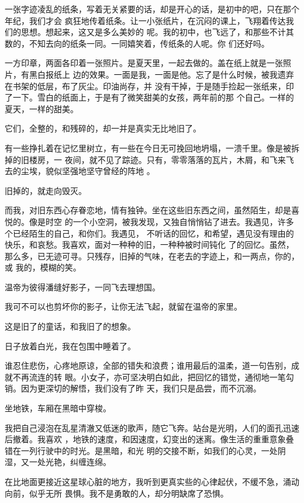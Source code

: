 \documentclass[12pt,a4paper]{article}
\begin{document}
		一张字迹凌乱的纸条，写着无关紧要的话，却是开心的话，是初中的吧，只在那个年纪，我们才会
	疯狂地传着纸条。让一小张纸片，在沉闷的课上，飞翔着传达我们的思想。想起来，这又是多么美妙的
	呢。我的初中，也飞远了，和那些不计其数的，不知去向的纸条一同。一同嬉笑着，传纸条的人呢。你
	们还好吗。

		一方印章，两面各印着一张照片。是夏天里，一起去做的。盖在纸上就是一张照片，有黑白报纸上
	边的效果。一面是我，一面是他。忘了是什么时候，被我遗弃在书架的低层，布了灰尘。印油尚存，并
	没有干掉，于是随手捡起一张纸来，印了一下。雪白的纸面上，于是有了微笑甜美的女孩，两年前的那
	个自己。一样的夏天，一样的甜美。

		它们，全整的，和残碎的，却一并是真实无比地旧了。

		有一些挣扎着在记忆里树立，有一些在今日无可挽回地坍塌，一溃千里。像是被拆掉的旧楼房，一
	夜间，就不见了踪迹。只有，零零落落的瓦片，木屑，和飞来飞去的尘埃，貌似坚强地坚守曾经的阵地
	。

		旧掉的，就走向毁灭。

		而我，对旧东西心存眷恋地，情有独钟。坐在这些旧东西之间，虽然陌生，却是喜悦的。像是时空
	的一个小空洞，被我发现，又独自悄悄钻了进去。我遇见，许多个已经陌生的自己，和你们。我遇见，
	不听话的回忆，和希望，遇见没有理由的快乐，和哀愁。我喜欢，面对一种种的旧，一种种被时间钝化
	了的回忆。虽然，那么多，已无迹可寻。只残存，旧掉的气味，在老去的字迹上，和一两点，你的，或
	我的，模糊的笑。

		温帝为彼得潘缝好影子，一同飞去理想国。

		我可不可以也剪坏你的影子，让你无法飞起，就留在温帝的家里。

		这是旧了的童话，和我旧了的想象。

		日子放着白光，我在包围中睡着了。

	\endwriting



		谁忍住悲伤，心疼地原谅，全部的错失和浪费；谁用最后的温柔，道一句告别，成就不再流连的转
	眼。小女子，亦可坚决明白如此，把回忆的错觉，通彻地一笔勾销。因为更深切的解悟，我们没有了昨
	天，我们只是品尝，而不沉溺。

		坐地铁，车厢在黑暗中穿梭。

		我把自己浸泡在乱星清澈又低迷的歌声，随它飞奔。站台是光明，人们的面孔迅速后撤着。我喜欢
	，地铁的速度，和因速度，幻变出的迷离。像生活的重重意象叠错在一列行驶中的时光。是黑暗，和光
	明的交接不断，如我们的心灵，一处阴湿，又一处光艳，纠缠连绵。

		在比地面更接近这星球心脏的地方，我听到更真实些的心律起伏，不缓不急，涌动向前，似乎无所
	畏惧。我不是勇敢的人，却分明缺席了恐惧。
\end{document}
